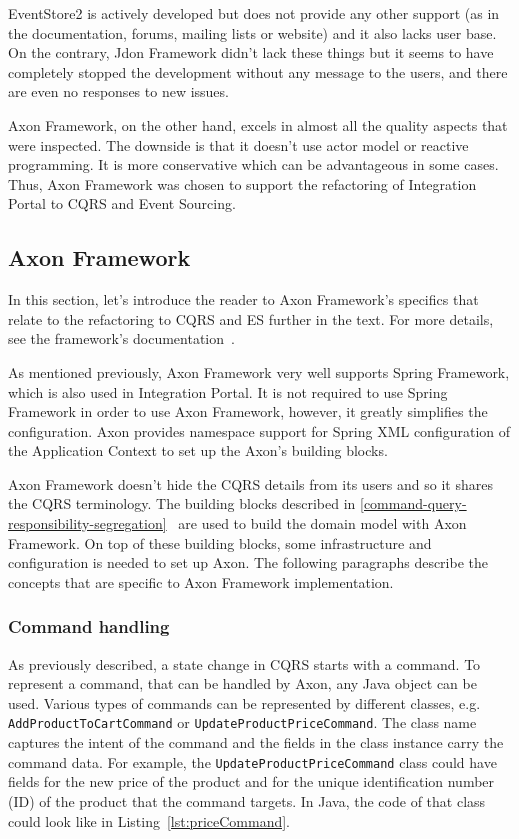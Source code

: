 \documentclass{book}
\begin{document}
EventStore2 is actively developed but does not provide any other support
(as in the documentation, forums, mailing lists or website) and it also
lacks user base. On the contrary, Jdon Framework didn't lack these
things but it seems to have completely stopped the development without
any message to the users, and there are even no responses to new issues.

Axon Framework, on the other hand, excels in almost all the quality
aspects that were inspected. The downside is that it doesn't use actor
model or reactive programming. It is more conservative which can be
advantageous in some cases. Thus, Axon Framework was chosen to support
the refactoring of Integration Portal to CQRS and Event Sourcing.


\subsection{Axon Framework}\label{axon-framework}

In this section, let's introduce the reader to Axon Framework's
specifics that relate to the refactoring to CQRS and ES further in the
text. For more details, see the framework's documentation~\cite{axon}.

As mentioned previously, Axon Framework very well supports Spring
Framework, which is also used in Integration Portal. It is not required
to use Spring Framework in order to use Axon Framework, however, it
greatly simplifies the configuration. Axon provides namespace support
for Spring XML configuration of the Application Context to set up the
Axon's building blocks.

Axon Framework doesn't hide the CQRS details from its users and so it
shares the CQRS terminology. The building blocks described in
\ref{command-query-responsibility-segregation}~ are used to build the
domain model with Axon Framework. On top of these building blocks, some
infrastructure and configuration is needed to set up Axon. The following
paragraphs describe the concepts that are specific to Axon Framework
implementation.


\subsubsection{Command handling}\label{command-handling}

As previously described, a state change in CQRS starts with a command.
To represent a command, that can be handled by Axon, any Java object can
be used. Various types of commands can be represented by different
classes, e.g. \texttt{AddProductToCartCommand} or
\texttt{UpdateProductPriceCommand}. The class name captures the intent
of the command and the fields in the class instance carry the command
data. For example, the \texttt{UpdateProductPriceCommand} class could
have fields for the new price of the product and for the unique
identification number (ID) of the product that the command targets. In
Java, the code of that class could look like in Listing~\ref{lst:priceCommand}.
\end{document}
